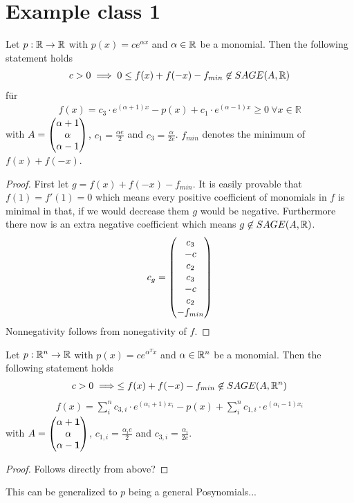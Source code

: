 \documentclass[./main.tex]{subfiles}
\begin{document}
\section{Example class 1}
\begin{thm}
Let $p: \mathbb{R} \rightarrow \mathbb{R}$ with $p(x) = c e^{\alpha x}$ and $\alpha \in \mathbb{R}$ be a monomial. Then the following statement holds
\begin{align*}
c> 0 \implies  0 \leq f(x)+f(-x)-f_{min} \not\in SAGE(A,\mathbb{R})
\end{align*}
für
\begin{align*}
f(x) = c_3 \cdot e^{(\alpha +1) x} -p(x) + c_1 \cdot e^{(\alpha -1) x} \geq 0 \ \forall x \in \mathbb{R}
\end{align*}
with $A = \begin{pmatrix}\alpha +1 \\ \alpha \\ \alpha -1 \end{pmatrix}$, $c_1 = \frac {\alpha e} {2} $ and $c_3 = \frac {\alpha} {2 e}$. $f_{min}$ denotes the minimum of $f(x)+f(-x)$.
\begin{proof} First let $g=f(x)+f(-x)-f_{min}$. It is easily provable that  $f(1)=f'(1)=0$ which means every positive coefficient of monomials in $f$ is minimal in that, if we would decrease them $g$ would be negative. Furthermore there now is an extra negative coefficient which means $g\not \in SAGE(A,\mathbb{R})$. 
\begin{align*}
c_g=\begin{pmatrix}c_3\\-c\\c_2\\c_3\\-c\\c_2\\-f_{min}\end{pmatrix}
\end{align*}
Nonnegativity follows from nonegativity of $f$.
\end{proof}

\end{thm}
\begin{thm}
Let $p: \mathbb{R}^n \rightarrow \mathbb{R}$ with $p(x) = c e^{\alpha^T x}$ and $\alpha \in \mathbb{R}^n$ be a monomial. Then the following statement holds
\begin{align*}
c> 0 \implies \leq f(x)+f(-x)-f_{min} \not\in SAGE(A,\mathbb{R}^n)
\end{align*}
\begin{align*}
f(x) = \sum_i^n c_{3,i} \cdot e^{(\alpha_i +1) x_i} -p(x) + \sum_i^n c_{1,i} \cdot e^{(\alpha_i -1) x_i}
\end{align*}
with $A = \begin{pmatrix}\alpha +\mathbf{1}\\ \alpha \\ \alpha -\mathbf{1} \end{pmatrix}$, $c_{1,i} = \frac {\alpha_i e} {2} $ and $c_{3,i} = \frac {\alpha_i} {2 e}$.
\begin{proof}
Follows directly from above?
\end{proof}
\end{thm}
This can be generalized to $p$ being a general Posynomials... 
\end{document}
